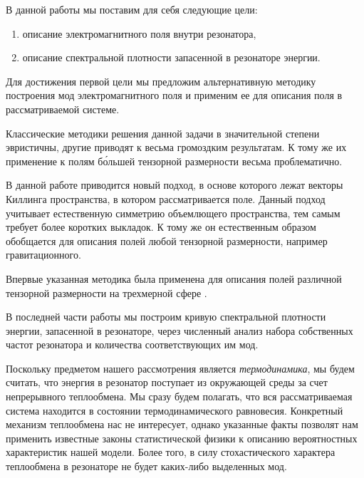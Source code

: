     В данной работы мы поставим для себя следующие цели:
    \begin{enumerate}[nosep]
        \item описание электромагнитного поля внутри резонатора,
        \item описание спектральной плотности запасенной в резонаторе энергии.
    \end{enumerate}

    Для достижения первой цели мы предложим альтернативную методику построения мод электромагнитного поля и применим ее для описания поля в рассматриваемой системе.

    Классические методики решения данной задачи в значительной степени эвристичны, другие приводят к весьма громоздким результатам. К тому же их применение к полям б\'{о}льшей тензорной размерности весьма проблематично. \cite{burlankov_tmf}

    В данной работе приводится новый подход, в основе которого лежат векторы Киллинга пространства, в котором рассматривается поле. Данный подход учитывает естественную симметрию объемлющего пространства, тем самым требует более коротких выкладок. К тому же он естественным образом обобщается для описания полей любой тензорной размерности, например гравитационного. \cite{burlankov_tmf}

    Впервые указанная методика была применена для описания полей различной тензорной размерности на трехмерной сфере \cite{burlankov_tmf}.

    В последней части работы мы построим кривую спектральной плотности энергии, запасенной в резонаторе, через численный анализ набора собственных частот резонатора и количества соответствующих им мод.

    Поскольку предметом нашего рассмотрения является \textit{термодинамика}, мы будем считать, что энергия в резонатор поступает из окружающей среды за счет непрерывного теплообмена. Мы сразу будем полагать, что вся рассматриваемая система находится в состоянии термодинамического равновесия. Конкретный механизм теплообмена нас не интересует, однако указанные факты позволят нам применить известные законы статистической физики к описанию вероятностных характеристик нашей модели. Более того, в силу стохастического характера теплообмена в резонаторе не будет каких-либо выделенных мод.
